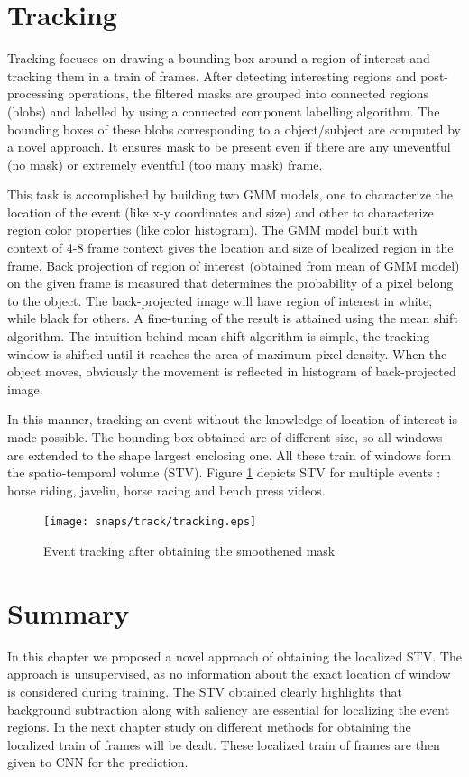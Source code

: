 \section{Tracking}
 \label{sec:trac}
Tracking focuses on drawing a bounding box around a region of interest and tracking them in a train of frames.  After detecting interesting regions and post-processing operations, the filtered masks are grouped into connected regions (blobs) and labelled by using a connected component labelling algorithm.  The bounding boxes of these blobs corresponding to a object/subject are computed by a novel approach.  It ensures mask to be present even if there are any uneventful (no mask) or extremely eventful (too many mask) frame.
\par This task is accomplished by building two GMM models, one to characterize the location of the event (like x-y coordinates and size) and other to characterize region color properties (like color histogram).  The GMM model built with context of 4-8 frame context gives the location and size of localized region in the frame.  Back projection \citep{backProj} of region of interest (obtained from mean of GMM model) on the given frame is measured that determines the probability of a pixel belong to the object.  The back-projected image  will have region of interest in white, while black for others.  A fine-tuning of the result is attained using the mean shift algorithm.  The intuition behind mean-shift algorithm is simple, the tracking window is shifted until it reaches the area of maximum pixel density.  When the object moves, obviously the movement is reflected in histogram of back-projected image. 
\par In this manner, tracking an event without the knowledge of location of interest is made possible.  The bounding box obtained are of different size, so all windows are extended to the shape largest enclosing one.  All these train of  windows form the spatio-temporal volume (STV). Figure \ref{fig:tracking} depicts STV for multiple events : horse riding, javelin, horse racing and bench press videos.
\begin{figure}[htpb]
   \begin{center}
	    \texttt{[image: snaps/track/tracking.eps]}     
     \caption {Event tracking after obtaining the smoothened mask}
   \label{fig:tracking}
   \end{center}
 \end{figure}
\section{Summary}
In this chapter we proposed a novel approach of obtaining the localized STV.  The approach is unsupervised, as no information about the exact location of window is considered during training.  The STV obtained clearly highlights that background subtraction along with saliency are essential for localizing the event regions. In the next chapter study on different methods for obtaining the localized train of frames will be dealt.  These localized train of frames are then given to CNN for the prediction.